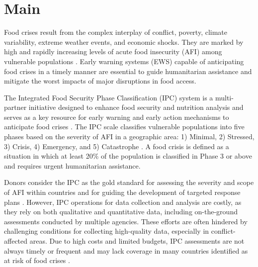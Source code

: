 \documentclass[pdflatex,sn-mathphys-num]{sn-jnl}%
\theoremstyle{thmstyleone}%
\theoremstyle{thmstyletwo}%
\theoremstyle{thmstylethree}%
\begin{document}


\maketitle

\section*{Main}\label{sec1}
Food crises result from the complex interplay of conflict, poverty, climate variability, extreme weather events, and economic shocks. They are marked by high and rapidly increasing levels of acute food insecurity (AFI) among vulnerable populations \cite{timmer2010preventing}. 
 Early warning systems (EWS) capable of anticipating food crises in a timely manner are essential to guide humanitarian assistance and mitigate the worst impacts of major disruptions in food access.

The Integrated Food Security Phase Classification (IPC) system is a multi-partner initiative designed to enhance food security and nutrition analysis and serves as a key resource for early warning and early action mechanisms to anticipate food crises \cite{IPC_nd}. The IPC scale classifies vulnerable populations into five  phases based on the severity of AFI in a geographic area: 1) Minimal, 2) Stressed, 3) Crisis, 4) Emergency, and 5) Catastrophe \cite{IPC2021}. A food crisis is defined as a situation in which at least 20\% of the population is classified in Phase 3 or above and requires urgent humanitarian assistance. %

Donors consider the IPC as the gold standard for assessing the severity and scope of AFI within countries and for guiding the development of targeted response plans \cite{IPC_nd}. However, IPC operations for data collection and analysis are costly, as they rely on both qualitative and quantitative data, including on-the-ground assessments conducted by multiple agencies. These efforts are often hindered by challenging conditions for collecting high-quality data, especially in conflict-affected areas. Due to high costs and limited budgets, IPC assessments are not always timely or frequent and may lack coverage in many countries identified as at risk of food crises \cite{FSIN2024}.
\end{document}
